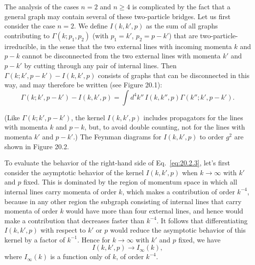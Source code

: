 The analysis of the cases $n=2$ and $n\geq4$ is complicated by the fact that
a general graph may contain several of these two-particle bridges. Let us
first consider the case $n=2$. We define $I(k,k',p)$ as the sum of all graphs
contributing to $\Gamma(k;p_1,p_2)$ (with $p_1=k'$,
$p_2=p-k'$) that are two-particle-irreducible, in the sense that the two
external lines with incoming momenta $k$ and $p-k$ cannot be disconnected
from the two external lines with momenta $k'$ and $p-k'$ by cutting through
any pair of internal lines. Then $\Gamma(k;k',p-k')-I(k,k',p)$ consists of
graphs that can be disconnected in this way, and may therefore be written
(see Figure 20.1):
\begin{equation}
 \Gamma(k;k',p-k')-I(k,k',p)
 =\int d^4k''\,I(k,k'',p)\Gamma(k'';k',p-k').
 \tag{20.2.3}\label{eq:20.2.3}
\end{equation}




(Like $\Gamma(k;k',p-k')$, the kernel $I(k,k',p)$ includes propagators for
the lines with momenta $k$ and $p-k$, but, to avoid double counting, not for
the lines with momenta $k'$ and $p-k'$.) The Feynman diagrams for
$I(k,k',p)$ to order $g^2$ are shown in Figure 20.2.

To evaluate the behavior of the right-hand side of Eq.~\eqref{eq:20.2.3},
let's first consider the asymptotic behavior of the kernel $I(k,k',p)$ when
$k\to\infty$ with $k'$ and $p$ fixed. This is dominated by the region of
momentum space in which all internal lines carry momenta of order $k$, which
makes a contribution of order $k^{-4}$, because in any other region the
subgraph consisting of internal lines that carry momenta of order $k$ would
have more than four external lines, and hence would make a contribution that
decreases faster than $k^{-4}$. It follows that differentiating $I(k,k',p)$
with respect to $k'$ or $p$ would reduce the asymptotic behavior of this
kernel by a factor of $k^{-1}$. Hence for $k\to\infty$ with $k'$ and $p$
fixed, we have
\begin{equation}
 I(k,k',p)\longrightarrow I_\infty(k),
 \tag{20.2.4}\label{eq:20.2.4}
\end{equation}
where $I_\infty(k)$ is a function only of $k$, of order $k^{-4}$.

